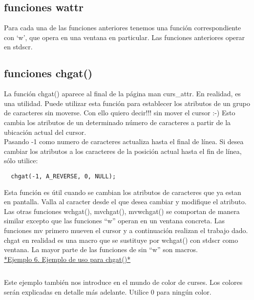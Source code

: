 \documentclass{article}
\begin{document}
\subsection{funciones wattr}%
Para cada una de las funciones anteriores tenemos una función correspondiente
con ‘w’, que opera en una ventana en particular. Las funciones anteriores
operar en stdscr.

\subsection{funciones chgat()}%
La función chgat() aparece al final de la página man curs\_attr. En realidad, es
una utilidad. Puede utilizar esta función para establecer los atributos de un
grupo de caracteres sin moverse. Con ello quiero decir!!! sin mover el cursor
:-) Esto cambia los atributos de un determinado número de caracteres a partir
de la ubicación actual del cursor.\\

Pasando -1 como numero de caracteres actualiza hasta el final de línea. Si
desea cambiar los atributos a los caracteres de la posición actual hasta el fin
de línea, sólo utilice:

\begin{verbatim}
  chgat(-1, A_REVERSE, 0, NULL);
\end{verbatim}

Esta función es útil cuando se cambian los atributos de caracteres que ya estan
en pantalla. Valla al caracter desde el que desea cambiar y modifique el
atributo.\\

Las otras funciones wchgat(), mvchgat(), mvwchgat() se comportan de manera
similar excepto que las funciones “w” operan en un ventana concreta. Las
funciones mv primero mueven el cursor y a continuación realizan el trabajo
dado. chgat en realidad es una macro que se sustituye por wchgat() con stdscr
como ventana. La mayor parte de las funciones de sin “w” son macros.\\

\href{https://github.com/nasciiboy/NCURSES-Programming-HOWTO/blob/master/ncurses_programs/basics/with_chgat.c}{*Ejemplo 6. Ejemplo de uso para chgat()*}
\inputminted{cpp}{./cpp/006_chgat.cpp}

Este ejemplo también nos introduce en el mundo de color de curses. Los colores
serán explicadas en detalle más adelante. Utilice 0 para ningún color.
\end{document}
